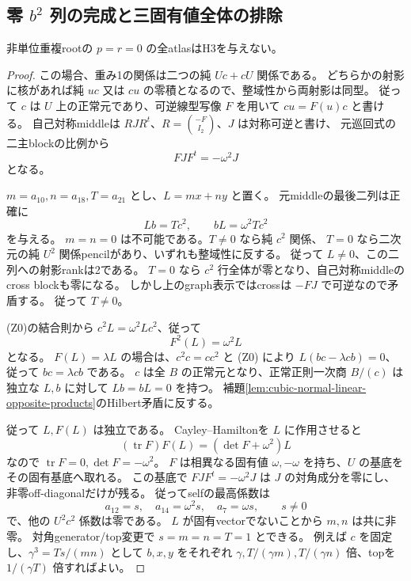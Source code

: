 \subsection{零 $b^2$ 列の完成と三固有値全体の排除}
\label{subsec:cubic-third-root-nonunit-zero-column}
\begin{theorem}
\label{thm:cubic-third-root-nonunit-zero-column-empty}
非単位重複rootの $p=r=0$ の全atlasはH3を与えない。
\end{theorem}
\begin{proof}
この場合、重み1の関係は二つの純 $Uc+cU$ 関係である。
どちらかの射影に核があれば純 $uc$ 又は $cu$ の零積となるので、整域性から両射影は同型。
従って $c$ は $U$ 上の正常元であり、可逆線型写像 $F$ を用いて
$c u=F(u)c$ と書ける。
自己対称middleは $RJR^t$、$R=\binom{-F}{I_2}$、$J$ は対称可逆と書け、
元巡回式の二主blockの比例から
\[
 FJF^t=-\omega^2J
\]
となる。

$m=a_{10},n=a_{18},T=a_{21}$ とし、$L=mx+ny$ と置く。
元middleの最後二列は正確に
\[
 Lb=T c^2,\qquad bL=\omega^2T c^2
\tag{Z0}
\]
を与える。
$m=n=0$ は不可能である。$T\ne0$ なら純 $c^2$ 関係、
$T=0$ なら二次元の純 $U^2$ 関係pencilがあり、いずれも整域性に反する。
従って $L\ne0$、この二列への射影rankは2である。
$T=0$ なら $c^2$ 行全体が零となり、自己対称middleのcross blockも零になる。
しかし上のgraph表示ではcrossは $-FJ$ で可逆なので矛盾する。
従って $T\ne0$。

(Z0)の結合則から
$c^2L=\omega^2Lc^2$、従って
\[
 F^2(L)=\omega^2L
\]
となる。
$F(L)=\lambda L$ の場合は、$c^2c=cc^2$ と (Z0) により
$L(bc-\lambda cb)=0$、従って $bc=\lambda cb$ である。
$c$ は全 $B$ の正常元となり、正常正則一次商 $B/(c)$ は
独立な $L,b$ に対して $Lb=bL=0$ を持つ。
補題\ref{lem:cubic-normal-linear-opposite-products}のHilbert矛盾に反する。

従って $L,F(L)$ は独立である。
Cayley--Hamiltonを $L$ に作用させると
\[
 (\operatorname{tr}F)F(L)=(\det F+\omega^2)L
\]
なので $\operatorname{tr}F=0,\det F=-\omega^2$。
$F$ は相異なる固有値 $\omega,-\omega$ を持ち、$U$ の基底をその固有基底へ取れる。
この基底で $FJF^t=-\omega^2J$ は $J$ の対角成分を零にし、
非零off-diagonalだけが残る。
従ってselfの最高係数は
\[
 a_{12}=s,\quad a_{14}=\omega^2s,\quad a_7=\omega s,
 \qquad s\ne0
\]
で、他の $U^2c^2$ 係数は零である。
$L$ が固有vectorでないことから $m,n$ は共に非零。
対角generator/top変更で $s=m=n=T=1$ とできる。
例えば $c$ を固定し、$\gamma^3=Ts/(mn)$ として
$b,x,y$ をそれぞれ $\gamma,T/(\gamma m),T/(\gamma n)$ 倍、topを $1/(\gamma T)$ 倍すればよい。


\end{proof}
